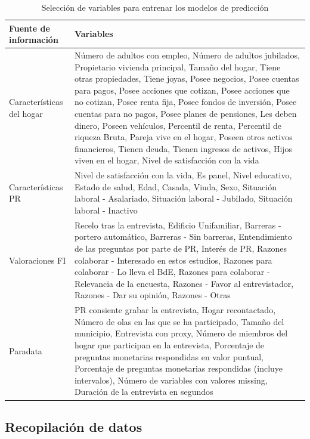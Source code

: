 \begin{table}[h]
    \centering
    \begin{tabular}{|l|p{10cm}|}
    \hline
        \textbf{Fuente de información} & \textbf{Variables} \\ \hline
        Características del hogar & Número de adultos con empleo, Número de adultos jubilados, Propietario vivienda principal, Tamaño del hogar, Tiene otras propiedades, Tiene joyas, Posee negocios, Posee cuentas para pagos, Posee acciones que cotizan, Posee acciones que no cotizan, Posee renta fija, Posee fondos de inversión, Posee cuentas para no pagos, Posee planes de pensiones, Les deben dinero, Poseen vehículos, Percentil de renta, Percentil de riqueza Bruta, Pareja vive en el hogar, Poseen otros activos financieros, Tienen deuda, Tienen ingresos de activos, Hijos viven en el hogar, Nivel de satisfacción con la vida \\ \hline
        Características PR & Nivel de satisfacción con la vida, Es panel, Nivel educativo, Estado de salud, Edad, Casada, Viuda, Sexo, Situación laboral - Asalariado, Situación laboral - Jubilado, Situación laboral - Inactivo \\ \hline
        Valoraciones FI & Recelo tras la entrevista, Edificio Unifamiliar, Barreras - portero automático, Barreras - Sin barreras, Entendimiento de las preguntas por parte de PR, Interés de PR, Razones colaborar - Interesado en estos estudios, Razones para colaborar - Lo lleva el BdE, Razones para colaborar - Relevancia de la encuesta, Razones - Favor al entrevistador, Razones - Dar su opinión, Razones - Otras \\ \hline
        Paradata & PR consiente grabar la entrevista, Hogar recontactado, Número de olas en las que se ha participado, Tamaño del municipio, Entrevista con proxy, Número de miembros del hogar que participan en la entrevista, Porcentaje de preguntas monetarias respondidas en valor puntual, Porcentaje de preguntas monetarias respondidas (incluye intervalos), Número de variables con valores missing, Duración de la entrevista en segundos \\ \hline
    \end{tabular}
    \caption{Selección de variables para entrenar los modelos de predicción}
\end{table}

\subsection{Recopilación de datos}

